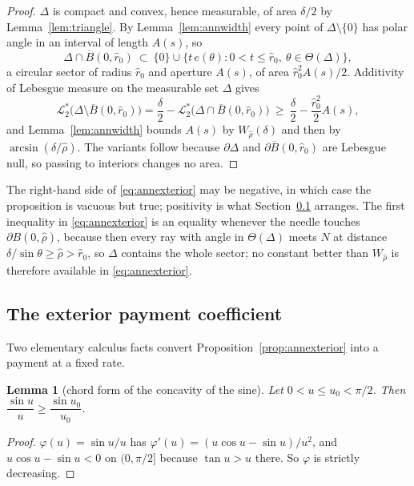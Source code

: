 \documentclass[11pt]{article}
\theoremstyle{plain}
\newtheorem{lemma}[theorem]{Lemma}
\theoremstyle{definition}
\theoremstyle{remark}
\newcommand{\Lout}{\mathcal{L}^{*}_{2}}
\begin{document}
\begin{proof}
$\Delta$ is compact and convex, hence measurable, of area $\delta/2$ by
Lemma~\ref{lem:triangle}. By Lemma~\ref{lem:annwidth} every point of
$\Delta\setminus\{0\}$ has polar angle in an interval of length $A(s)$, so
\[
  \Delta\cap\overline B(0,\hat r_{0})\ \subset\
  \{0\}\cup\{t\,e(\theta):0<t\le\hat r_{0},\ \theta\in\Theta(\Delta)\},
\]
a circular sector of radius $\hat r_{0}$ and aperture $A(s)$, of area
$\hat r_{0}^{2}A(s)/2$. Additivity of Lebesgue measure on the measurable set
$\Delta$ gives
\[
  \Lout\bigl(\Delta\setminus\overline B(0,\hat r_{0})\bigr)
  =\frac{\delta}{2}-\Lout\bigl(\Delta\cap\overline B(0,\hat r_{0})\bigr)
  \ \ge\ \frac{\delta}{2}-\frac{\hat r_{0}^{2}}{2}A(s),
\]
and Lemma~\ref{lem:annwidth} bounds $A(s)$ by $W_{\hat\rho}(\delta)$ and then
by $\arcsin(\delta/\hat\rho)$. The variants follow because $\partial\Delta$ and
$\partial\overline B(0,\hat r_{0})$ are Lebesgue null, so passing to interiors
changes no area.
\end{proof}

The right-hand side of \eqref{eq:annexterior} may be negative, in which case
the proposition is vacuous but true; positivity is what
Section~\ref{sec:annpayment} arranges. The first inequality in
\eqref{eq:annexterior} is an equality whenever the needle touches
$\partial B(0,\hat\rho)$, because then every ray with angle in $\Theta(\Delta)$
meets $N$ at distance $\delta/\sin\theta\ge\hat\rho>\hat r_{0}$, so $\Delta$
contains the whole sector; no constant better than $W_{\hat\rho}$ is therefore
available in \eqref{eq:annexterior}.

\subsection{The exterior payment coefficient}\label{sec:annpayment}

Two elementary calculus facts convert Proposition~\ref{prop:annexterior} into a
payment at a fixed rate.

\begin{lemma}[chord form of the concavity of the sine]\label{lem:annchord}
Let $0<u\le u_{0}<\pi/2$. Then $\dfrac{\sin u}{u}\ge\dfrac{\sin u_{0}}{u_{0}}$.
\end{lemma}

\begin{proof}
$\varphi(u)=\sin u/u$ has $\varphi'(u)=(u\cos u-\sin u)/u^{2}$, and
$u\cos u-\sin u<0$ on $(0,\pi/2]$ because $\tan u>u$ there. So $\varphi$ is
strictly decreasing.
\end{proof}
\end{document}
